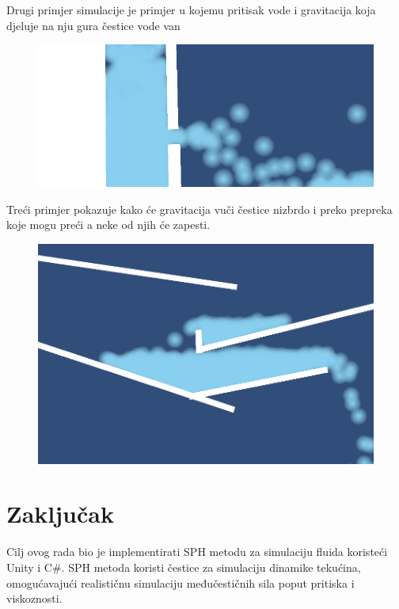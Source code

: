 \documentclass[diplomskirad]{fer}
\begin{document}
    \pagebreak
    Drugi primjer simulacije je primjer u kojemu pritisak vode i gravitacija koja djeluje na nju gura čestice vode van

    \begin{figure}[H]
        \centering
        \includegraphics[scale=0.5]{images/pritisakGuraVodu}
        \label{fig:pritisak}
    \end{figure}

    Treći primjer pokazuje kako će gravitacija vuči čestice nizbrdo i preko prepreka koje mogu preći a neke od njih će zapesti.

    \begin{figure}[H]
        \centering
        \includegraphics[scale=0.5]{images/gravitacija}
        \label{fig:gravitacija}
    \end{figure}


    \chapter{Zaključak}\label{pog:zakljucak}

    Cilj ovog rada bio je implementirati SPH metodu za simulaciju fluida koristeći Unity i C#. SPH metoda koristi čestice za simulaciju dinamike tekućina, omogućavajući realističnu simulaciju međučestičnih sila poput pritiska i viskoznosti.
\end{document}
